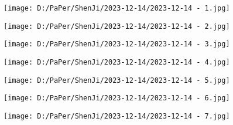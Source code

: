 \documentclass{article}
\begin{document}
\begin{figure}[h!]
	\centering
	\texttt{[image: D:/PaPer/ShenJi/2023-12-14/2023-12-14 - 1.jpg]}
\end{figure}

\begin{figure}[h!]
	\centering
	\texttt{[image: D:/PaPer/ShenJi/2023-12-14/2023-12-14 - 2.jpg]}
\end{figure}

\begin{figure}[h!]
	\centering
	\texttt{[image: D:/PaPer/ShenJi/2023-12-14/2023-12-14 - 3.jpg]}
\end{figure}

\begin{figure}[h!]
	\centering
	\texttt{[image: D:/PaPer/ShenJi/2023-12-14/2023-12-14 - 4.jpg]}
\end{figure}

\begin{figure}[h!]
	\centering
	\texttt{[image: D:/PaPer/ShenJi/2023-12-14/2023-12-14 - 5.jpg]}
\end{figure}

\begin{figure}[h!]
	\centering
	\texttt{[image: D:/PaPer/ShenJi/2023-12-14/2023-12-14 - 6.jpg]}
\end{figure}

\begin{figure}[h!]
	\centering
	\texttt{[image: D:/PaPer/ShenJi/2023-12-14/2023-12-14 - 7.jpg]}
\end{figure}
\end{document}
